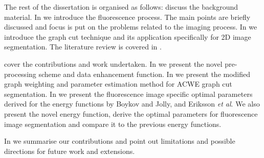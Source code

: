 The rest of the dissertation is organised as follows:
 discuss the background material.
In  we introduce the fluorescence process. The main points are briefly discussed and focus is put on the problems related to the imaging process.
In  we introduce the graph cut technique and its application specifically for 2D image segmentation. The literature review is covered in .

 cover the contributions and work undertaken.
In  we present the novel pre-processing scheme and data enhancement function.
In  we present the modified graph weighting and parameter estimation method for ACWE graph cut segmentation.
In  we present the fluorescence image specific optimal parameters derived for the energy functions by Boykov and Jolly, and Eriksson \textit{et al}. We also present the novel energy function, derive the optimal parameters for fluorescence image segmentation and compare it to the previous energy functions.

In  we summarise our contributions and point out limitations and possible directions for future work and extensions.